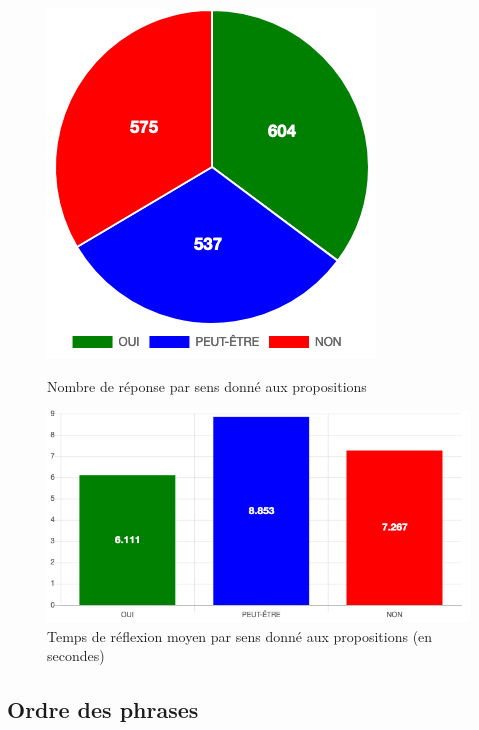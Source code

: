 \documentclass[11pt,letterpaper]{article}
\begin{document}
\vspace{6px}

\begin{figure}[htb]
    \begin{minipage}[t]{.45\textwidth}
        \centering
        \includegraphics[width=.65\textwidth]{figures/nb-type.png}
        \caption{Nombre de réponse par sens donné aux propositions}\label{fig:nb-type}
    \end{minipage}
    \hfill
    \begin{minipage}[t]{.52\textwidth}
        \centering
        \includegraphics[width=\textwidth]{figures/temps-type.png}
        \caption{Temps de réflexion moyen par sens donné aux propositions (en secondes)}\label{fig:temps-type}
    \end{minipage} 
\end{figure}

\subsection{Ordre des phrases}
\end{document}
